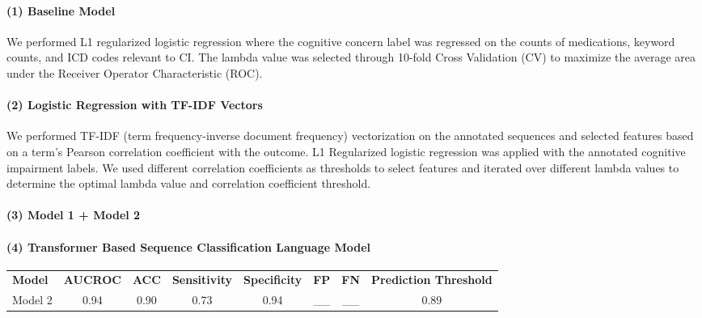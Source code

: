 \documentclass[pmlr,twocolumn,10pt]{jmlr} %
\begin{document}
\label{sec:Baseline}  
\paragraph{(1) Baseline Model} We performed L1 regularized logistic regression where the cognitive concern label was regressed on the counts of medications, keyword counts, and ICD codes relevant to CI. The lambda value was selected through 10-fold Cross Validation (CV) to maximize the average area under the Receiver Operator Characteristic (ROC). %

\label{sec:TFIDF}  
\paragraph{(2) Logistic Regression with TF-IDF Vectors} We performed TF-IDF (term frequency-inverse document frequency) vectorization on the annotated sequences and selected features based on a term's Pearson correlation coefficient with the outcome. L1 Regularized logistic regression was applied with the annotated cognitive impairment labels. We used different correlation coefficients as thresholds to select features and iterated over different lambda values to determine the optimal lambda value and correlation coefficient threshold. 

\label{sec:Baseline+TFIDF}  
\paragraph{(3) Model 1 + Model 2} %

\label{sec:Transformer}  
\paragraph{(4) Transformer Based Sequence Classification Language Model} %

\begin{table*}[hbtp]
  {\begin{tabular}{lccccccc}
    \toprule 
    
    \bfseries Model & \bfseries AUCROC & \bfseries ACC & \bfseries Sensitivity & \bfseries Specificity & \bfseries FP & \bfseries FN & \bfseries Prediction Threshold \\ 
    Model 2 & 0.94 & 0.90 & 0.73 & 0.94 & __ & __ & 0.89 \\
    
    \bottomrule
  \end{tabular}}
 
\end{table*}
\end{document}
